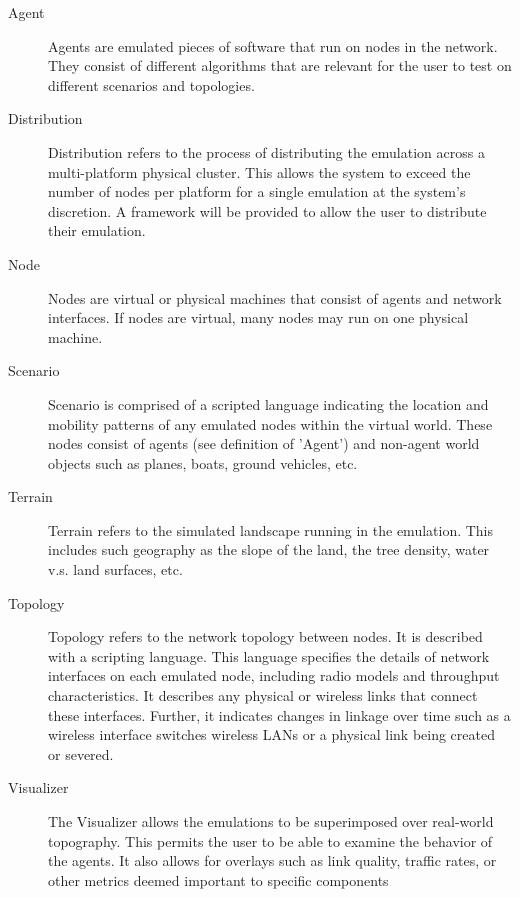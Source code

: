 \documentclass[titlepage]{article}
\begin{document}
\begin{description}
\item[Agent]
	Agents are emulated pieces of software that run on nodes in the network. They consist of different algorithms that are relevant for the user to test on different scenarios and topologies.   

\item[Distribution]
	Distribution refers to the process of distributing the emulation across a multi-platform physical cluster.  This allows the system to exceed the number of nodes per platform for a single emulation at the system's discretion.  A framework will be provided to allow the user to distribute their emulation. 	

\item[Node]
	Nodes are virtual or physical machines that consist of agents and network interfaces.  If nodes are virtual, many nodes may run on one physical machine.  

\item[Scenario]
	Scenario is comprised of a scripted language indicating the location and mobility patterns of any emulated nodes within the virtual world. These nodes consist of agents (see definition of 'Agent') and non-agent world objects such as planes, boats, ground vehicles, etc. 

\item[Terrain]
	Terrain refers to the simulated landscape running in the emulation.  This includes such geography as the slope of the land, the tree density, water v.s. land surfaces, etc.

\item[Topology]
	Topology refers to the network topology between nodes. It is described with a scripting language.  This language specifies the details of network interfaces on each emulated node, including radio models and throughput characteristics.  It describes any physical or wireless links that connect these interfaces.  Further, it indicates changes in linkage over time such as a wireless interface switches wireless LANs or a physical link being created or severed. 

\item[Visualizer]
	The Visualizer allows the emulations to be superimposed over real-world topography.  This permits the user to be able to examine the behavior of the agents.  It also allows for overlays such as link quality, traffic rates, or other metrics deemed important to specific components

\end{description}
\end{document}
